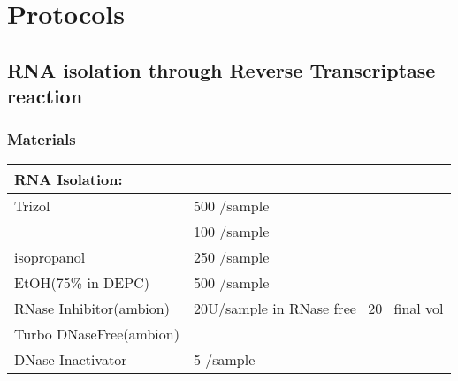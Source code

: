 \chapter{Protocols}

\section{RNA isolation through Reverse Transcriptase reaction} \label{prot:RNA_Judy}
\subsection{Materials}
{\sf
\begin{tabular}{ll} \toprule
RNA Isolation: &\\ \midrule
Trizol						&	500 \mul/sample \\
\chlf						&	100 \mul/sample \\
isopropanol					&	250 \mul/sample \\
EtOH(75\% in DEPC)			&	500 \mul/sample \\
RNase Inhibitor(ambion)	&	20U/sample in RNase free \water\  20 \mul\ final vol \\
Turbo DNaseFree(ambion)		&	\\
DNase Inactivator			&	5 \mul/sample \\
\bottomrule
\end{tabular} 
}

